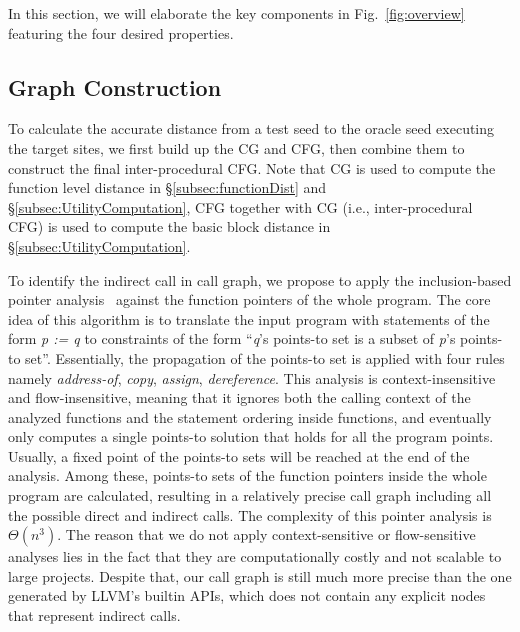 In this section, we will elaborate the key components in Fig.~\ref{fig:overview} featuring the four desired properties.


\subsection{Graph Construction} \label{subsec:graghCons}

To calculate the accurate distance from a test seed to the oracle seed executing the target sites, we first build up the CG and CFG, then combine them to construct the final inter-procedural CFG. Note that CG is used to compute the function level distance in \S\ref{subsec:functionDist} and \S\ref{subsec:UtilityComputation}, CFG together with CG (i.e., inter-procedural CFG) is used to compute the basic block distance in \S\ref{subsec:UtilityComputation}.  	









To identify the indirect call in call graph, we propose to apply the inclusion-based pointer analysis~\cite{Andersen94programanalysis} against the function pointers of the whole program. The core idea of this algorithm is to translate the input program with statements of the form \emph{p := q} to constraints of the form ``\emph{q}'s points-to set is a subset of \emph{p}'s points-to set''. 
Essentially, the propagation of the points-to set is applied with four rules namely \emph{address-of}, \emph{copy}, \emph{assign}, \emph{dereference}. This analysis is context-insensitive and flow-insensitive, meaning that it ignores both the calling context of the analyzed functions and the statement ordering inside functions, and eventually only computes a single points-to solution that holds for all the program points. Usually, a fixed point of the points-to sets will be reached at the end of the analysis. Among these, points-to sets of the function pointers inside the whole program are calculated, resulting in a relatively precise call graph including all the possible direct and indirect calls. The complexity of this pointer analysis is $\Theta(n^3)$.
The reason that we do not apply context-sensitive or flow-sensitive analyses lies in the fact that they are computationally costly and not scalable to large projects. Despite that, our call graph is still much more precise than the one generated by LLVM's builtin APIs, which does not contain any explicit nodes that represent indirect calls. 

